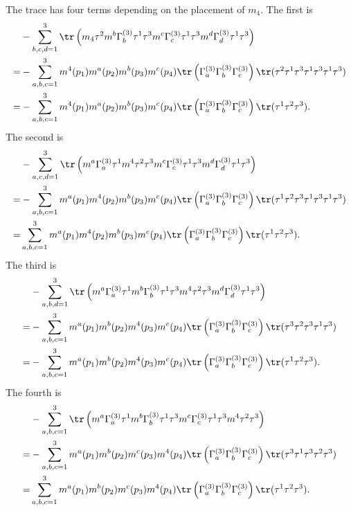 The trace has four terms depending on the placement of $m_{4}$. The first is
\begin{align*}
	 &-\sum\limits_{b, c, d = 1}^{3}\tr\left(m_{4}\tau^{2}m^{b}\Gamma_{b}^{(3)}\tau^{1}\tau^{3}m^{c}\Gamma_{c}^{(3)}\tau^{1}\tau^{3}m^{d}\Gamma_{d}^{(3)}\tau^{1}\tau^{3}\right) \\
	=& -\sum\limits_{a, b, c = 1}^{3}m^{4}(p_{1})m^{a}(p_{2})m^{b}(p_{3})m^{c}(p_{4})\tr\left(\Gamma_{a}^{(3)}\Gamma_{b}^{(3)}\Gamma_{c}^{(3)}\right)\tr(\tau^{2}\tau^{1}\tau^{3}\tau^{1}\tau^{3}\tau^{1}\tau^{3}) \\
	=& -\sum\limits_{a, b, c = 1}^{3}m^{4}(p_{1})m^{a}(p_{2})m^{b}(p_{3})m^{c}(p_{4})\tr\left(\Gamma_{a}^{(3)}\Gamma_{b}^{(3)}\Gamma_{c}^{(3)}\right)\tr(\tau^{1}\tau^{2}\tau^{3}).
\end{align*}
The second is
\begin{align*}
	 &-\sum\limits_{a, c, d = 1}^{3}\tr\left(m^{a}\Gamma_{a}^{(3)}\tau^{1}m^{4}\tau^{2}\tau^{3}m^{c}\Gamma_{c}^{(3)}\tau^{1}\tau^{3}m^{d}\Gamma_{d}^{(3)}\tau^{1}\tau^{3}\right) \\
	=& -\sum\limits_{a, b, c = 1}^{3}m^{a}(p_{1})m^{4}(p_{2})m^{b}(p_{3})m^{c}(p_{4})\tr\left(\Gamma_{a}^{(3)}\Gamma_{b}^{(3)}\Gamma_{c}^{(3)}\right)\tr(\tau^{1}\tau^{2}\tau^{3}\tau^{1}\tau^{3}\tau^{1}\tau^{3}) \\
	=& \sum\limits_{a, b, c = 1}^{3}m^{a}(p_{1})m^{4}(p_{2})m^{b}(p_{3})m^{c}(p_{4})\tr\left(\Gamma_{a}^{(3)}\Gamma_{b}^{(3)}\Gamma_{c}^{(3)}\right)\tr(\tau^{1}\tau^{2}\tau^{3}).
\end{align*}
The third is
\begin{align*}
	 &-\sum\limits_{a, b, d = 1}^{3}\tr\left(m^{a}\Gamma_{a}^{(3)}\tau^{1}m^{b}\Gamma_{b}^{(3)}\tau^{1}\tau^{3}m^{4}\tau^{2}\tau^{3}m^{d}\Gamma_{d}^{(3)}\tau^{1}\tau^{3}\right) \\
	=& -\sum\limits_{a, b, c = 1}^{3}m^{a}(p_{1})m^{b}(p_{2})m^{4}(p_{3})m^{c}(p_{4})\tr\left(\Gamma_{a}^{(3)}\Gamma_{b}^{(3)}\Gamma_{c}^{(3)}\right)\tr(\tau^{3}\tau^{2}\tau^{3}\tau^{1}\tau^{3}) \\
	=& -\sum\limits_{a, b, c = 1}^{3}m^{a}(p_{1})m^{b}(p_{2})m^{4}(p_{3})m^{c}(p_{4})\tr\left(\Gamma_{a}^{(3)}\Gamma_{b}^{(3)}\Gamma_{c}^{(3)}\right)\tr(\tau^{1}\tau^{2}\tau^{3}).
\end{align*}
The fourth is
\begin{align*}
	 &-\sum\limits_{a, b, c = 1}^{3}\tr\left(m^{a}\Gamma_{a}^{(3)}\tau^{1}m^{b}\Gamma_{b}^{(3)}\tau^{1}\tau^{3}m^{c}\Gamma_{c}^{(3)}\tau^{1}\tau^{3}m^{4}\tau^{2}\tau^{3}\right) \\
	=& -\sum\limits_{a, b, c = 1}^{3}m^{a}(p_{1})m^{b}(p_{2})m^{c}(p_{3})m^{4}(p_{4})\tr\left(\Gamma_{a}^{(3)}\Gamma_{b}^{(3)}\Gamma_{c}^{(3)}\right)\tr(\tau^{3}\tau^{1}\tau^{3}\tau^{2}\tau^{3}) \\
	=& \sum\limits_{a, b, c = 1}^{3}m^{a}(p_{1})m^{b}(p_{2})m^{c}(p_{3})m^{4}(p_{4})\tr\left(\Gamma_{a}^{(3)}\Gamma_{b}^{(3)}\Gamma_{c}^{(3)}\right)\tr(\tau^{1}\tau^{2}\tau^{3}).
\end{align*}
